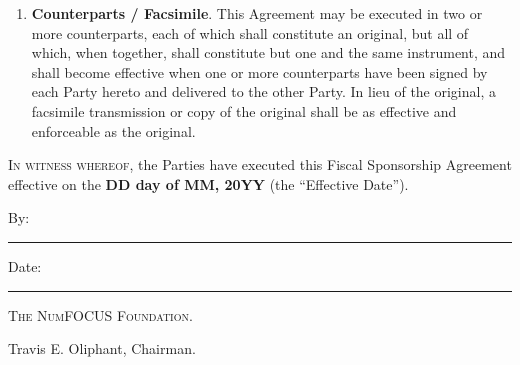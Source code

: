 \documentclass[english,letterpaper,12pt]{article}
\newcommand{\agreementdate}{\textbf{DD day of MM, 20YY}}
\begin{document}
\begin{enumerate}[label=\arabic*.,ref=\S~\arabic*]
\item \textbf{Counterparts / Facsimile}. This Agreement may be executed in two
  or more counterparts, each of which shall constitute an original, but all of
  which, when together, shall constitute but one and the same instrument, and
  shall become effective when one or more counterparts have been signed by each
  Party hereto and delivered to the other Party.  In lieu of the original, a
  facsimile transmission or copy of the original shall be as effective and
  enforceable as the original.

\end{enumerate}

\vfill{}


\textsc{In witness whereof}, the Parties have executed this Fiscal
Sponsorship Agreement effective on the \agreementdate{} (the
``Effective Date'').

\vspace{3em}


By: \hspace{0.95em}\rule{0.50\textwidth}{0.2mm} \hfill{}Date: \rule{0.25\textwidth}{0.2mm}

\hspace{2.5em} \textsc{The NumFOCUS Foundation.}

\hspace{2.5em} Travis E. Oliphant, Chairman.  \\[6ex]

\vspace{2ex}


\end{document}
